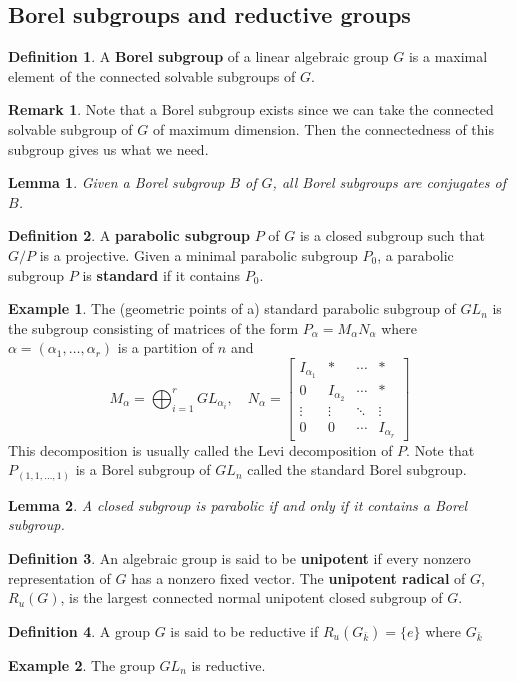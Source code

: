 \documentclass[12pt]{report}
\newtheorem{lemma}{Lemma}[section]
\theoremstyle{remark}
\theoremstyle{definition}
\newtheorem{remark}{Remark}[section]
\newtheorem{example}{Example}[section]
\newtheorem{definition}{Definition}[section]
\begin{document}
    \subsection{Borel subgroups and reductive groups}
    \begin{definition}
        A \textbf{Borel subgroup} of a linear algebraic group $G$ is a maximal element of the connected solvable subgroups of $G$.
    \end{definition}
    \begin{remark}
        Note that a Borel subgroup exists since we can take the connected solvable subgroup of $G$ of maximum dimension. Then the connectedness of this subgroup gives us what we need.
    \end{remark}
    \begin{lemma}
        Given a Borel subgroup $B$ of $G$, all Borel subgroups are conjugates of $B$.
    \end{lemma}
    \begin{definition}
        A \textbf{parabolic subgroup} $P$ of $G$ is a closed subgroup such that $G/P$ is a projective. Given a minimal parabolic subgroup $P_0$, a parabolic subgroup $P$ is \textbf{standard} if it contains $P_0$.
    \end{definition}
    \begin{example}
        The (geometric points of a) standard parabolic subgroup of $GL_n$ is the subgroup consisting of matrices of the form $P_\alpha=M_\alpha N_\alpha$ where $\alpha=(\alpha_1,\dots,\alpha_r)$ is a partition of $n$ and
        \[M_\alpha=\bigoplus_{i=1}^r GL_{\alpha_i},\quad N_\alpha=\begin{bmatrix}
            I_{\alpha_1} & * & \cdots & *\\
            0 & I_{\alpha_2} & \cdots & *\\
            \vdots & \vdots & \ddots & \vdots\\
            0 & 0 & \cdots & I_{\alpha_r}
        \end{bmatrix}\]
        This decomposition is usually called the Levi decomposition of $P$. Note that $P_{(1,1,\dots,1)}$ is a Borel subgroup of $GL_n$ called the standard Borel subgroup.
    \end{example}
    \begin{lemma}
        A closed subgroup is parabolic if and only if it contains a Borel subgroup.
    \end{lemma}
    \begin{definition}
        An algebraic group is said to be \textbf{unipotent} if every nonzero representation of $G$ has a nonzero fixed vector. The \textbf{unipotent radical} of $G$, $R_u(G)$, is the largest connected normal unipotent closed subgroup of $G$.
    \end{definition}
    \begin{definition}
        A group $G$ is said to be reductive if $R_u(G_{\bar k})=\{e\}$ where $G_{\bar k}$
    \end{definition}
    \begin{example}
        The group $GL_n$ is reductive.
    \end{example}
\end{document}
